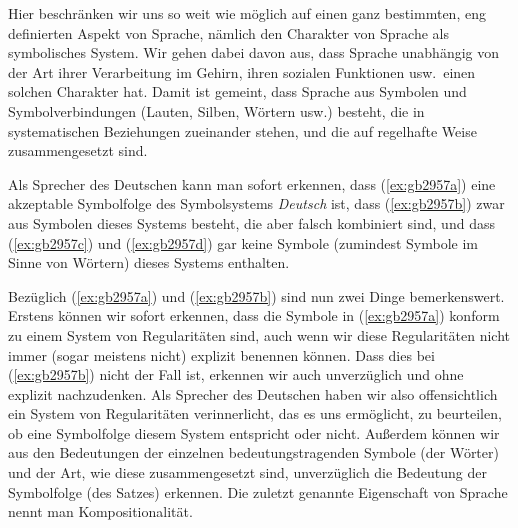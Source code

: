 Hier beschränken wir uns so weit wie möglich auf einen ganz bestimmten, eng definierten Aspekt von Sprache, nämlich den Charakter von Sprache als symbolisches System.
Wir gehen dabei davon aus, dass Sprache unabhängig von der Art ihrer Verarbeitung im Gehirn, ihren sozialen Funktionen usw.\ einen solchen Charakter hat.
Damit ist gemeint, dass Sprache aus Symbolen und Symbolverbindungen (Lauten, Silben, Wörtern usw.) besteht, die in systematischen Beziehungen zueinander stehen, und die auf regelhafte Weise zusammengesetzt sind.

Als Sprecher des Deutschen kann man \zB sofort erkennen, dass (\ref{ex:gb2957a}) eine akzeptable Symbolfolge des Symbolsystems \textit{Deutsch} ist, dass (\ref{ex:gb2957b}) zwar aus Symbolen dieses Systems besteht, die aber falsch kombiniert sind, und dass (\ref{ex:gb2957c}) und (\ref{ex:gb2957d}) gar keine Symbole (zumindest Symbole im Sinne von Wörtern) dieses Systems enthalten.

\begin{exe}
  \ex
  \begin{xlist}
  \end{xlist}
\end{exe}


Bezüglich (\ref{ex:gb2957a}) und (\ref{ex:gb2957b}) sind nun zwei Dinge bemerkenswert.
Erstens können wir sofort erkennen, dass die Symbole in (\ref{ex:gb2957a}) konform zu einem System von Regularitäten sind, auch wenn wir diese Regularitäten nicht immer (sogar meistens nicht) explizit benennen können.
Dass dies bei (\ref{ex:gb2957b}) nicht der Fall ist, erkennen wir auch unverzüglich und ohne explizit nachzudenken.
Als Sprecher des Deutschen haben wir also offensichtlich ein System von Regularitäten verinnerlicht, das es uns ermöglicht, zu beurteilen, ob eine Symbolfolge diesem System entspricht oder nicht.
Außerdem können wir aus den Bedeutungen der einzelnen bedeutungstragenden Symbole (der Wörter) und der Art, wie diese zusammengesetzt sind, unverzüglich die Bedeutung der Symbolfolge (des Satzes) erkennen.
Die zuletzt genannte Eigenschaft von Sprache nennt man Kompositionalität.



